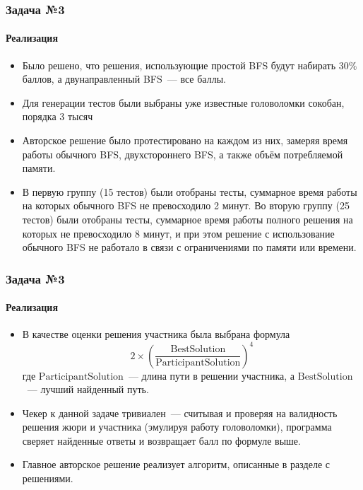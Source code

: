 \documentclass{beamer}
\begin{document}
\begin{frame}
\frametitle{Задача №3}
\framesubtitle{Реализация}
\begin{itemize}
\item Было решено, что решения, использующие простой BFS будут набирать $30\%$ баллов, а двунаправленный BFS~--- все баллы.
\item Для генерации тестов были выбраны уже известные головоломки сокобан, порядка 3 тысяч
\item Авторское решение было протестировано на каждом из них, замеряя время работы обычного BFS, двухстороннего BFS, а также объём потребляемой памяти.
\item В первую группу (15 тестов) были отобраны тесты, суммарное время работы на которых обычного BFS не превосходило 2 минут. Во вторую группу (25 тестов) были отобраны тесты, суммарное время работы полного решения на которых не превосходило 8 минут, и при этом решение с использование обычного BFS не работало в связи с ограничениями по памяти или времени.
\end{itemize}
\end{frame}








\begin{frame}
\frametitle{Задача №3}
\framesubtitle{Реализация}
\begin{itemize}
\item В качестве оценки решения участника была выбрана формула $$2 \times\left(\frac{\text {BestSolution}}{\text {ParticipantSolution}}\right)^{4}$$где $\text{ParticipantSolution}$~--- длина пути в решении участника, а $\text{BestSolution}$~--- лучший найденный путь.
\item Чекер к данной задаче тривиален~--- считывая и проверяя на валидность решения жюри и участника (эмулируя работу головоломки), программа сверяет найденные ответы и возвращает балл по формуле выше.
\item Главное авторское решение реализует алгоритм, описанные в разделе с решениями.
\end{itemize}
\end{frame}
\end{document}

